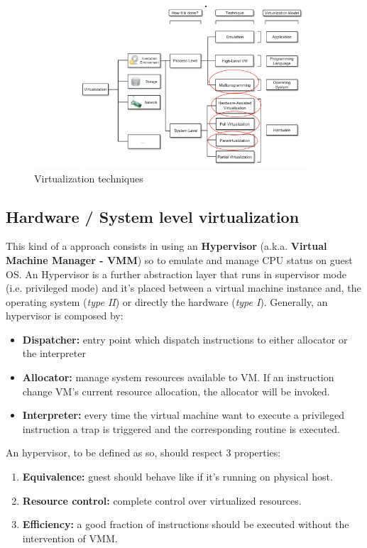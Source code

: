 \documentclass{article}
\begin{document}
\begin{figure}[H]
    \centering
    \includegraphics[width=4in]{imgs/virttech.PNG}
    \caption{Virtualization techniques}
    \label{fig:virttech}
\end{figure}

\subsection{Hardware / System level virtualization}
This kind of a approach consists in using an \textbf{Hypervisor} (a.k.a. \textbf{Virtual Machine Manager - VMM}) so to emulate and manage CPU status on guest OS. An Hypervisor is a further abstraction layer that runs in supervisor mode (i.e. privileged mode) and it's placed between a virtual machine instance and, the operating system (\textit{type II}) or directly the hardware (\textit{type I}). Generally, an hypervisor is composed by:
\begin{itemize}
    \item \textbf{Dispatcher:} entry point which dispatch instructions to either allocator or the interpreter
    \item \textbf{Allocator:} manage system resources available to VM. If an instruction change VM's current resource allocation, the allocator will be invoked.
    \item \textbf{Interpreter:} every time the virtual machine want to execute a privileged instruction a trap is triggered and the corresponding routine is executed.
\end{itemize}
An hypervisor, to be defined as so, should respect 3 properties:
\begin{enumerate}
    \item \textbf{Equivalence:} guest should behave like if it's running on physical host.
    \item \textbf{Resource control:} complete control over virtualized resources.
    \item \textbf{Efficiency:} a good fraction of instructions should be executed without the intervention of VMM.
\end{enumerate}
\end{document}
